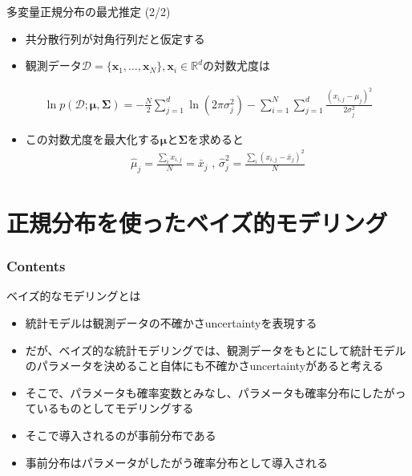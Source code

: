 \documentclass[aspectratio=169,unicode,dvipdfmx,14pt]{beamer}
\begin{document}
\begin{frame}{多変量正規分布の最尤推定 (2/2)}
\begin{itemize}
\item 共分散行列が対角行列だと仮定する
\item 観測データ$\mathcal{D}=\{ \bm{x}_1, \ldots, \bm{x}_N \}, \bm{x}_i \in \mathbb{R}^d$の対数尤度は
\end{itemize}
\begin{align}
\ln p(\mathcal{D};\bm{\mu},\bm{\Sigma})
= -\frac{N}{2}\sum_{j=1}^d \ln(2\pi\sigma_j^2) - \sum_{i=1}^N \sum_{j=1}^d \frac{(x_{i,j} - \mu_j)^2}{2\sigma_j^2}
\end{align}
\begin{itemize}
\item この対数尤度を最大化する$\bm{\mu}$と$\bm{\Sigma}$を求めると
\begin{align}
\hat{\mu}_j = \frac{\sum_i x_{i,j}}{N} = \bar{x}_j \mbox{ , \ }
\hat{\sigma}_j^2 = \frac{\sum_i (x_{i,j} - \bar{x}_j)^2}{N}
\end{align}
\end{itemize}
\end{frame}


\section{正規分布を使ったベイズ的モデリング}

\begin{frame}\frametitle{Contents}
\Large \tableofcontents[currentsection]
\end{frame}

\begin{frame}{ベイズ的なモデリングとは}
\begin{itemize}
\item 統計モデルは観測データの不確かさuncertaintyを表現する
\item だが、ベイズ的な統計モデリングでは、観測データをもとにして統計モデルのパラメータを決めること自体にも不確かさuncertaintyがあると考える
\item そこで、パラメータも確率変数とみなし、パラメータも確率分布にしたがっているものとしてモデリングする
\item そこで導入されるのが事前分布である
\item 事前分布はパラメータがしたがう確率分布として導入される
\end{itemize}
\end{frame}
\end{document}
